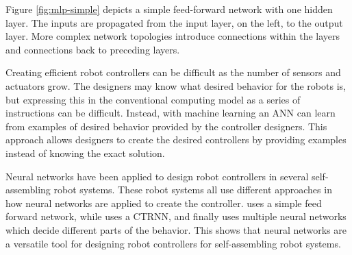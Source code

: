 Figure \ref{fig:mlp-simple} depicts a simple feed-forward network with one hidden layer.
The inputs are propagated from the input layer, on the left, to the output layer.
More complex network topologies introduce connections within the layers and connections back to preceding layers.

Creating efficient robot controllers can be difficult as the number of sensors and actuators grow.
The designers may know what desired behavior for the robots is, but expressing this in the conventional computing model as a series of instructions can be difficult.
Instead, with machine learning an ANN can learn from examples of desired behavior provided by the controller designers.
This approach allows designers to create the desired controllers by providing examples instead of knowing the exact solution.

Neural networks have been applied to design robot controllers in several\cite{trianni_evolving_2004, montanier_adaptive_2014, brandt_atron_2007} self-assembling robot systems.
These robot systems all use different approaches in how neural networks are applied to create the controller.
\cite{montanier_adaptive_2014} uses a simple feed forward network, while \cite{trianni_evolving_2004} uses a CTRNN, and finally \cite{brandt_atron_2007} uses multiple neural networks which decide different parts of the behavior.
This shows that neural networks are a versatile tool for designing robot controllers for self-assembling robot systems.

